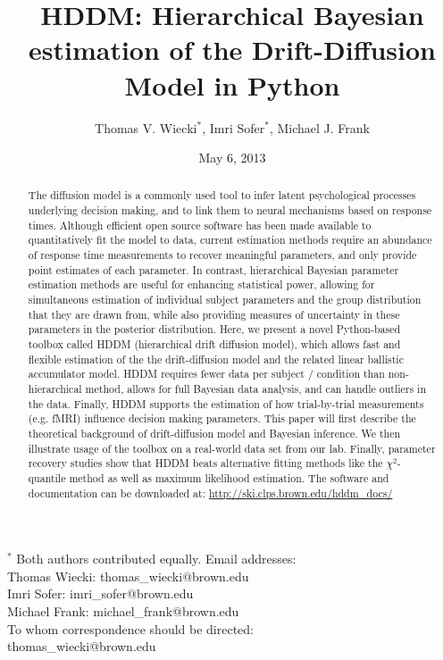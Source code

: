 \documentclass[letterpaper,10pt,english]{article}
\title{HDDM: Hierarchical Bayesian estimation of the Drift-Diffusion
Model in Python}
\date{May 6, 2013}
\author{Thomas V. Wiecki$^\ast$, Imri Sofer$^\ast$, Michael J. Frank}
\begin{document}
\maketitle

$^\ast$ Both authors contributed equally.
Email addresses:\\
Thomas Wiecki: thomas\_wiecki@brown.edu\\
Imri Sofer: imri\_sofer@brown.edu\\
Michael Frank: michael\_frank@brown.edu\\

To whom correspondence should be directed:\\
thomas\_wiecki@brown.edu\\
\begin{abstract}
\label{abstract:abstract}
The diffusion model is a commonly used tool to infer latent
psychological processes underlying decision making, and to link them
to neural mechanisms based on response times. Although efficient open
source software has been made available to quantitatively fit the
model to data, current estimation methods require an abundance of
response time measurements to recover meaningful parameters, and only
provide point estimates of each parameter.  In contrast, hierarchical
Bayesian parameter estimation methods are useful for enhancing
statistical power, allowing for simultaneous estimation of individual
subject parameters and the group distribution that they are drawn
from, while also providing measures of uncertainty in these parameters
in the posterior distribution. Here, we present a novel Python-based
toolbox called HDDM (hierarchical drift diffusion model), which allows
fast and flexible estimation of the the drift-diffusion model and the
related linear ballistic accumulator model. HDDM requires fewer data
per subject / condition than non-hierarchical method, allows for full
Bayesian data analysis, and can handle outliers in the data.  Finally,
HDDM supports the estimation of how trial-by-trial measurements (e.g.
fMRI) influence decision making parameters. This paper will first
describe the theoretical background of drift-diffusion model and
Bayesian inference. We then illustrate usage of the toolbox on a
real-world data set from our lab. Finally, parameter recovery studies
show that HDDM beats alternative fitting methods like the
$\chi^2$-quantile method as well as maximum likelihood estimation. The
software and documentation can be downloaded at:
\href{http://ski.clps.brown.edu/hddm\_docs/}{http://ski.clps.brown.edu/hddm\_docs/}
\end{abstract}
\end{document}
